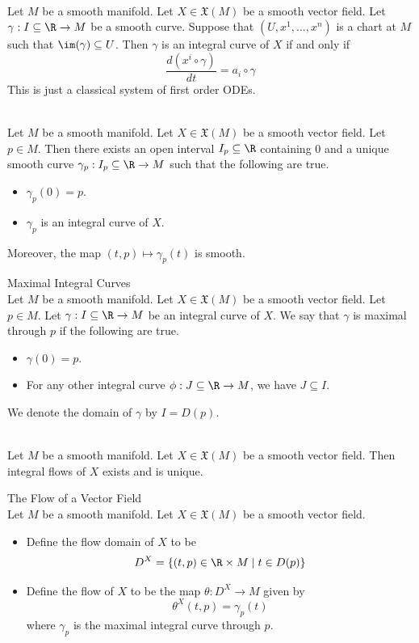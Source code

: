 \documentclass[a4paper]{article}
\begin{document}
\begin{eg}{}{}\\
Let $M$ be a smooth manifold. Let $X\in\mathfrak{X}(M)$ be a smooth vector field. Let $\gamma:I\subseteq\R\to M$ be a smooth curve. Suppose that $(U,x^1,\dots,x^n)$ is a chart at $M$ such that $\im(\gamma)\subseteq U$. Then $\gamma$ is an integral curve of $X$ if and only if $$\frac{d(x^i\circ\gamma)}{dt}=a_i\circ\gamma$$ This is just a classical system of first order ODEs. 
\end{eg}

\begin{prp}{}{}\\
Let $M$ be a smooth manifold. Let $X\in\mathfrak{X}(M)$ be a smooth vector field. Let $p\in M$. Then there exists an open interval $I_p\subseteq\R$ containing $0$ and a unique smooth curve $\gamma_p:I_p\subseteq\R\to M$ such that the following are true. 
\begin{itemize}
\item $\gamma_p(0)=p$. 
\item $\gamma_p$ is an integral curve of $X$. 
\end{itemize}
Moreover, the map $(t,p)\mapsto\gamma_p(t)$ is smooth. 
\end{prp}

\begin{defn}{Maximal Integral Curves}{}\\
Let $M$ be a smooth manifold. Let $X\in\mathfrak{X}(M)$ be a smooth vector field. Let $p\in M$. Let $\gamma:I\subseteq\R\to M$ be an integral curve of $X$. We say that $\gamma$ is maximal through $p$ if the following are true. 
\begin{itemize}
\item $\gamma(0)=p$. 
\item For any other integral curve $\phi:J\subseteq\R\to M$, we have $J\subseteq I$. 
\end{itemize}
We denote the domain of $\gamma$ by $I=D(p)$. 
\end{defn}

\begin{prp}{}{}\\
Let $M$ be a smooth manifold. Let $X\in\mathfrak{X}(M)$ be a smooth vector field. Then integral flows of $X$ exists and is unique. 
\end{prp}

\begin{defn}{The Flow of a Vector Field}{}\\
Let $M$ be a smooth manifold. Let $X\in\mathfrak{X}(M)$ be a smooth vector field. 
\begin{itemize}
\item Define the flow domain of $X$ to be $$D^X=\{(t,p)\in\R\times M\;|\;t\in D(p)\}$$
\item Define the flow of $X$ to be the map $\theta:D^X\to M$ given by $$\theta^X(t,p)=\gamma_p(t)$$ where $\gamma_p$ is the maximal integral curve through $p$. 
\end{itemize}
\end{defn}
\end{document}
